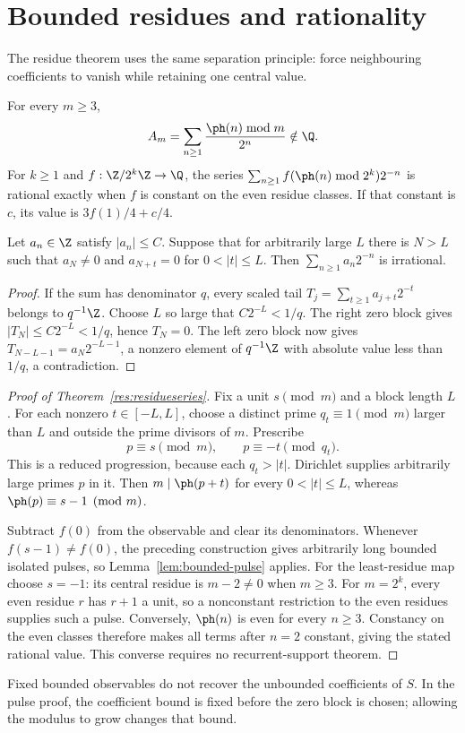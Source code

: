 \section{Bounded residues and rationality}\label{sec:family}
The residue theorem uses the same separation principle: force neighbouring
coefficients to vanish while retaining one central value.

\begin{theorem}\label{res:residueseries}
For every $m\ge3$,
\[
 A_m=\sum_{n\ge1}\frac{\ph(n)\bmod m}{2^n}\notin\Q.
\]
For $k\ge1$ and $f:\Z/2^k\Z\to\Q$, the series
$\sum_{n\ge1}f(\ph(n)\bmod2^k)2^{-n}$ is rational exactly when $f$ is
constant on the even residue classes. If that constant is $c$, its value is
$3f(1)/4+c/4$.
\end{theorem}

\begin{lemma}\label{lem:bounded-pulse}
Let $a_n\in\Z$ satisfy $|a_n|\le C$. Suppose that for arbitrarily large $L$
there is $N>L$ such that $a_N\ne0$ and
$a_{N+t}=0$ for $0<|t|\le L$. Then $\sum_{n\ge1}a_n2^{-n}$ is irrational.
\end{lemma}
\begin{proof}
If the sum has denominator $q$, every scaled tail
$T_j=\sum_{t\ge1}a_{j+t}2^{-t}$ belongs to $q^{-1}\Z$.
Choose $L$ so large that $C2^{-L}<1/q$.
The right zero block gives $|T_N|\le C2^{-L}<1/q$, hence $T_N=0$.
The left zero block now gives
$T_{N-L-1}=a_N2^{-L-1}$, a nonzero element of $q^{-1}\Z$ with absolute
value less than $1/q$, a contradiction.
\end{proof}

\begin{proof}[Proof of Theorem~\ref{res:residueseries}]
Fix a unit $s\pmod m$ and a block length $L$. For each nonzero
$t\in[-L,L]$, choose a distinct prime $q_t\equiv1\pmod m$ larger than $L$
and outside the prime divisors of $m$. Prescribe
\[
 p\equiv s\pmod m,\qquad p\equiv-t\pmod{q_t}.
\]
This is a reduced progression, because each $q_t>|t|$. Dirichlet supplies
arbitrarily large primes $p$ in it. Then $m\mid\ph(p+t)$ for every
$0<|t|\le L$, whereas $\ph(p)\equiv s-1\pmod m$.

Subtract $f(0)$ from the observable and clear its denominators. Whenever
$f(s-1)\ne f(0)$, the preceding construction gives arbitrarily long bounded
isolated pulses, so Lemma~\ref{lem:bounded-pulse} applies. For the
least-residue map choose $s=-1$: its central residue is $m-2\ne0$ when
$m\ge3$. For $m=2^k$, every even residue $r$ has $r+1$ a unit, so a
nonconstant restriction to the even residues supplies such a pulse.
Conversely, $\ph(n)$ is even for every $n\ge3$. Constancy on the even
classes therefore makes all terms after $n=2$ constant, giving the stated
rational value. This converse requires no recurrent-support theorem.
\end{proof}
Fixed bounded observables do not recover the unbounded coefficients of
$S$. In the pulse proof, the coefficient bound is fixed before the zero
block is chosen; allowing the modulus to grow changes that bound.
